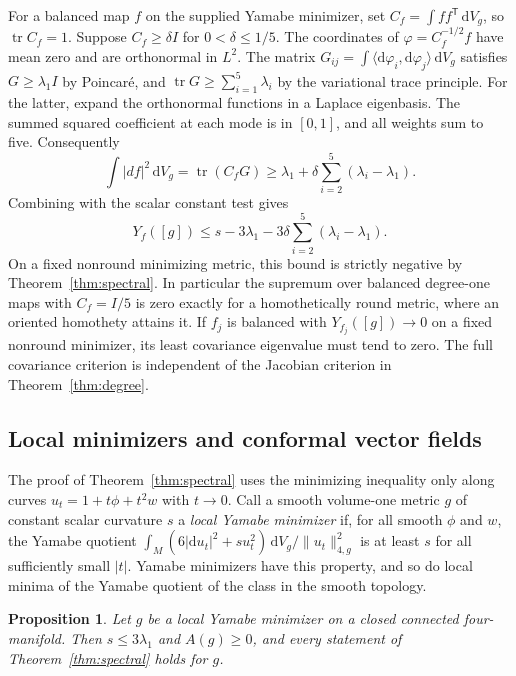 \documentclass[11pt]{article}
\numberwithin{equation}{section}
\newtheorem{proposition}[theorem]{Proposition}
\DeclareMathOperator{\tr}{tr}
\newcommand{\dd}{\mathrm{d}}
\newcommand{\ip}[2]{\langle #1,#2\rangle}
\newcommand{\abs}[1]{\lvert #1\rvert}
\newcommand{\norm}[1]{\lVert #1\rVert}
\newcommand{\dv}{\dd V_g}
\newcommand{\Yf}{Y_f([g])}
\begin{document}
For a balanced map \(f\) on the supplied Yamabe minimizer, set
\(C_f=\int ff^{\mathsf T}\,\dv\), so \(\tr C_f=1\).
Suppose \(C_f\ge\delta I\) for \(0<\delta\le1/5\).
The coordinates of \(\varphi=C_f^{-1/2}f\) have mean zero
and are orthonormal in \(L^2\). The matrix
\(G_{ij}=\int\ip{\dd\varphi_i}{\dd\varphi_j}\,\dv\)
satisfies \(G\ge\lambda_1 I\) by Poincar\'e,
and \(\tr G\ge\sum_{i=1}^5\lambda_i\) by the variational trace
principle. For the latter, expand the orthonormal functions in a
Laplace eigenbasis. The summed squared coefficient at each mode
is in \([0,1]\), and all weights sum to five.
Consequently
\[
 \int\abs{df}^2\,\dv=\tr(C_fG)
 \ge \lambda_1+\delta\sum_{i=2}^5(\lambda_i-\lambda_1).
\]
Combining with the scalar constant test gives
\begin{equation}\label{eq:covariance-gap}
 \Yf\le s-3\lambda_1-3\delta\sum_{i=2}^5(\lambda_i-\lambda_1).
\end{equation}
On a fixed nonround minimizing metric, this bound is strictly
negative by Theorem~\ref{thm:spectral}. In particular the supremum
over balanced degree-one maps with \(C_f=I/5\) is zero exactly for
a homothetically round metric, where an oriented homothety attains
it. If \(f_j\) is balanced with \(Y_{f_j}([g])\to0\) on a fixed nonround
minimizer, its least covariance eigenvalue must tend to zero. The
full covariance criterion is independent of the Jacobian criterion
in Theorem~\ref{thm:degree}.

\subsection{Local minimizers and conformal vector fields}\label{sec:local}

The proof of Theorem~\ref{thm:spectral} uses the minimizing inequality
only along curves \(u_t=1+t\phi+t^2w\) with \(t\to0\). Call a smooth
volume-one metric \(g\) of constant scalar curvature \(s\) a
\emph{local Yamabe minimizer} if, for all smooth \(\phi\) and \(w\),
the Yamabe quotient
\(\int_M(6\abs{\dd u_t}^2+su_t^2)\,\dv/\norm{u_t}_{4,g}^2\)
is at least \(s\) for all sufficiently small \(\abs t\).
Yamabe minimizers have this property, and so do local minima of the
Yamabe quotient of the class in the smooth topology.

\begin{proposition}\label{prop:local}
Let \(g\) be a local Yamabe minimizer on a closed connected
four-manifold. Then \(s\le3\lambda_1\) and \(A(g)\ge0\), and every
statement of Theorem~\ref{thm:spectral} holds for \(g\).
\end{proposition}
\end{document}
